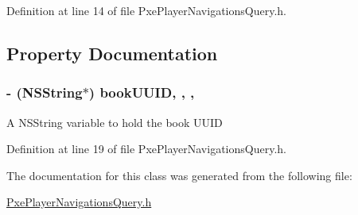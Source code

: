Definition at line 14 of file Pxe\-Player\-Navigations\-Query.\-h.



\subsection{Property Documentation}
\hypertarget{interface_pxe_player_navigations_query_a1266ecf2f78b4331a6f1efa1c7015ea2}{
\subsubsection[{book\-U\-U\-I\-D}]{\setlength{\rightskip}{0pt plus 5cm}-\/ (N\-S\-String$\ast$) book\-U\-U\-I\-D\hspace{0.3cm}{\ttfamily [read]}, {\ttfamily [write]}, {\ttfamily [nonatomic]}, {\ttfamily [strong]}}}\label{interface_pxe_player_navigations_query_a1266ecf2f78b4331a6f1efa1c7015ea2}
A N\-S\-String variable to hold the book U\-U\-I\-D 

Definition at line 19 of file Pxe\-Player\-Navigations\-Query.\-h.



The documentation for this class was generated from the following file\-:\begin{DoxyCompactItemize}
\item 
\hyperlink{_pxe_player_navigations_query_8h}{Pxe\-Player\-Navigations\-Query.\-h}\end{DoxyCompactItemize}
